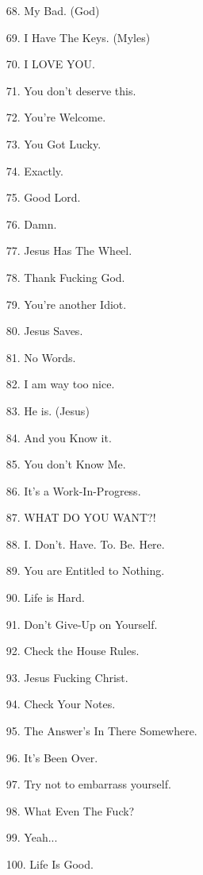 \documentclass[11pt]{article}
\begin{document}
\begin{enumerate}
	\item[68.] My Bad. (God)
	\item[69.] I Have The Keys. (Myles)
	\item[70.] I LOVE YOU.
	\item[71.] You don't deserve this.
	\item[72.] You're Welcome.
	\item[73.] You Got Lucky.
	\item[74.] Exactly.
	\item[75.] Good Lord.
	\item[76.] Damn.
	\item[77.] Jesus Has The Wheel.
	\item[78.] Thank Fucking God.
	\item[79.] You're another Idiot.
	\item[80.] Jesus Saves.
	\item[81.] No Words.
	\item[82.] I am way too nice.
	\item[83.] He is. (Jesus)
	\item[84.] And you Know it.
	\item[85.] You don't Know Me.
	\item[86.] It's a Work-In-Progress.
	\item[87.] WHAT DO YOU WANT?!
	\item[88.] I. Don't. Have. To. Be. Here.
	\item[89.] You are Entitled to Nothing.
	\item[90.] Life is Hard.
	\item[91.] Don't Give-Up on Yourself.
	\item[92.] Check the House Rules.
	\item[93.] Jesus Fucking Christ.
	\item[94.] Check Your Notes.
	\item[95.] The Answer's In There Somewhere.
	\item[96.] It's Been Over.
	\item[97.] Try not to embarrass yourself.
	\item[98.] What Even The Fuck?
	\item[99.] Yeah...
	\item[100.] Life Is Good.
	
\end{enumerate}
\end{document}
